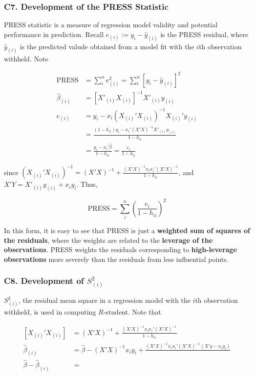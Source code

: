 \documentclass[12pt]{article}
\begin{document}
\subsubsection*{C7. Development of the PRESS Statistic}

PRESS statistic is a measure of regression model validity and potential performance in prediction. Recall $e_{(i)} := y_i - \hat{y}_{(i)}$ is the PRESS residual, where $\hat{y}_{(i)}$ is the predicted valude obtained from a model fit with the $i$th observation withheld. Note

$$
\begin{aligned}
\mathrm{PRESS} &= \sum_i^n e_{(i)}^2 = \sum_i^n [ y_i - \hat{y}_{(i)} ]^2 \\[8pt]
\hat{\beta}_{(i)} &= [X'_{(i)} X_{(i)}]^{-1} X'_{(i)} y_{(i)} \\[10pt]
e_{(i)} &= y_i - x_i(X_{(i)}' X_{(i)})^{-1} X_{(i)}' y_{(i)} \\[8pt]
&= \frac{ (1 - h_{ii})y_i - x_i' (X'X)^{-1} X'_{(i)} y_(i) } {  1 - h_{ii} } \\[8pt]
&= \frac{ y_i - x_i' \hat{\beta}  }{ 1 - h_{ii} } = \frac{ e_i}{ 1 - h_{ii} }
\end{aligned}
$$

since $(X_{(i)}' X_{(i)})^{-1} = (X'X)^{-1} + \frac{ (X'X)^{-1}x_ix_i'(X'X)^{-1} }{ 1 - h_{ii} }$, and $X'Y = X'_{(i)}y_{(i)} + x_iy_i $. Thus,


$$
\mathrm{PRESS} = \sum_i^n \left( \frac{e_i}{1 - h_{ii}} \right)^2
$$

In this form, it is easy to see that PRESS is just a \textbf{weighted sum of squares of the residuals}, where the weights are related to the \textbf{leverage of the observations}. PRESS weights the residuals corresponding to \textbf{high-leverage observations} more severely than the residuals from less influential points.


\subsubsection*{C8. Development of $S_{(i)}^2$ }

$S_{(i)}^2$, the residual mean square in a regression model with the $i$th observation withheld, is used in computing $R$-student. Note that 

$$
\begin{aligned}
[X_{(i)}' X_{(i)}] &= (X'X)^{-1} + \frac{(X'X)^{-1} x_i x_i' (X'X)^{-1} }{1-h_{ii}} \\[10pt]
\hat{\beta}_{(i)} &= \hat{\beta} - (X'X)^{-1}x_i y_i + \frac{ (X'X)^{-1} x_ix_i' (X'X)^{-1} (X'y - x_iy_i) }{  } \\[8pt]
\hat{\beta} - \hat{\beta}_{(i)} &= \frac{}{}
\end{aligned}
$$
\end{document}
